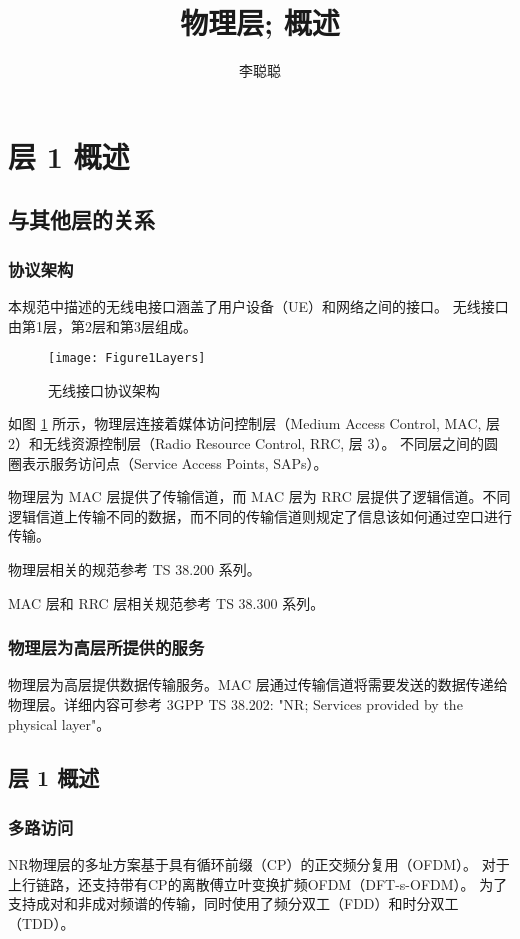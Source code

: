 \documentclass[cn,hazy,blue,14pt,screen,device=normal]{elegantnote}
\title{物理层; 概述}
\author{李聪聪}
\institute{3GPP TS 38.201 V15.0.0}
\date{\zhtoday}
\begin{document}
\maketitle

\newpage
\tableofcontents
\newpage

\section{层 1 概述}
\subsection{与其他层的关系}
\subsubsection{协议架构}
 本规范中描述的无线电接口涵盖了用户设备（UE）和网络之间的接口。 无线接口由第1层，第2层和第3层组成。
 
 \begin{figure}[!hbp]
 	\centering
 	\texttt{[image: Figure1Layers]}
 	\caption{无线接口协议架构}
    \label{Figure1Layers}
 \end{figure}


如图 \ref{Figure1Layers} 所示，物理层连接着媒体访问控制层（Medium Access Control, MAC, 层 2）和无线资源控制层（Radio Resource Control, RRC, 层 3）。 不同层之间的圆圈表示服务访问点（Service Access Points, SAPs）。

物理层为 MAC 层提供了传输信道，而 MAC 层为 RRC 层提供了逻辑信道。不同逻辑信道上传输不同的数据，而不同的传输信道则规定了信息该如何通过空口进行传输。

物理层相关的规范参考 TS 38.200 系列。

MAC 层和 RRC 层相关规范参考 TS 38.300 系列。

\subsubsection{物理层为高层所提供的服务}
物理层为高层提供数据传输服务。MAC 层通过传输信道将需要发送的数据传递给物理层。详细内容可参考 3GPP TS 38.202: "NR; Services provided by the physical layer"。

\subsection{层 1 概述}
\subsubsection{多路访问}
NR物理层的多址方案基于具有循环前缀（CP）的正交频分复用（OFDM）。 对于上行链路，还支持带有CP的离散傅立叶变换扩频OFDM（DFT-s-OFDM）。 为了支持成对和非成对频谱的传输，同时使用了频分双工（FDD）和时分双工（TDD）。
\end{document}
